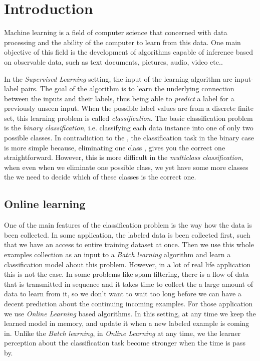 \chapter{Introduction}


Machine learning is a  field of computer science that concerned with data processing and the ability
of the computer to learn from this data. 
One main objective of this field is the development of algorithms capable of inference based on 
observable data, such as text documents, pictures, audio, video etc.. 
 
In the \textit{Supervised Learning} setting, the input of the learning algorithm are input-label pairs. 
The goal of the algorithm is to learn the underlying connection between the inputs and their labels, 
thus being able to \textit{predict} a label for a previously unseen input. 
When the possible label values are from a discrete finite set, this learning problem is called
 \textit{classification}. The basic classification problem is the \textit{binary classification}, i.e. classifying 
 each data instance into one of only two possible classes. In contradiction to 
 the , the classification task in the binary 
 case is more simple because, eliminating one class , gives you the correct one 
 straightforward. However, this is more difficult in the \textit{multiclass 
 classification}, when even when we eliminate one possible class, we yet have 
 some more classes the we need to decide which of these classes  is the correct one. 
 

\section{Online learning}
\label{sec:online_learning}

One of the main features of the classification problem is the way how the data is been collected. 
In some application, the labeled data is been collected first, such that we have an access to entire training
 dataset at once. Then we use this whole examples collection as an input to 
 a \textit{Batch learning} algorithm and learn a classification model about this problem. 
However, in a lot of real life application this is not the case. In some problems like spam filtering, there is
a flow of data that is transmitted in sequence and it takes time to collect the a large amount of data to learn
 from it, so we don't want to wait too long before we can have a decent prediction about the continuing
  incoming examples. For those application we use  \textit{Online Learning} based algorithms. 
  In this setting, at any time we keep the learned model in memory, and update it when 
  a new labeled example is coming in.
Unlike the \textit{Batch learning}, in \textit{Online Learning} at any time, we 
the learner perception about the classification task become stronger when the time is pass by.
 
